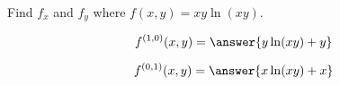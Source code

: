 \documentclass{ximera}
\author{David Guichard \and Neal Koblitz \and H. Jerome Keisler \and Albert Scheller \and Barry Balof \and Mike Wills \and Matthew Carr}
\begin{document}
\begin{exercise}




Find $f_x$ and $f_y$ where $f(x,y)=xy\ln(xy)$.

\begin{prompt}
\[
f^{(1,0)}(x,y)=\answer{y\ln(xy)+y}
\]
\end{prompt}

\begin{prompt}
\[
f^{(0,1)}(x,y)=\answer{x\ln(xy)+x}
\]
\end{prompt}

\end{exercise}
\end{document}
